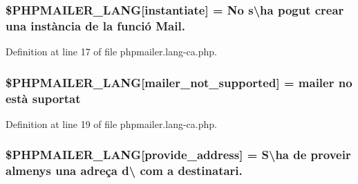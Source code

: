 \subsubsection[{\texorpdfstring{\$\+P\+H\+P\+M\+A\+I\+L\+E\+R\+\_\+\+L\+A\+NG}{$PHPMAILER_LANG}}]{\setlength{\rightskip}{0pt plus 5cm}\$P\+H\+P\+M\+A\+I\+L\+E\+R\+\_\+\+L\+A\+NG\mbox{[}\textquotesingle{}instantiate\textquotesingle{}\mbox{]} = \textquotesingle{}No s\textbackslash{}\textquotesingle{}ha pogut crear una instància de la funció Mail.\textquotesingle{}}\hypertarget{phpmailer_8lang-ca_8php_ad58dde16780f4770ccf4dd282ea1f5ad}{}\label{phpmailer_8lang-ca_8php_ad58dde16780f4770ccf4dd282ea1f5ad}


Definition at line 17 of file phpmailer.\+lang-\/ca.\+php.

\subsubsection[{\texorpdfstring{\$\+P\+H\+P\+M\+A\+I\+L\+E\+R\+\_\+\+L\+A\+NG}{$PHPMAILER_LANG}}]{\setlength{\rightskip}{0pt plus 5cm}\$P\+H\+P\+M\+A\+I\+L\+E\+R\+\_\+\+L\+A\+NG\mbox{[}\textquotesingle{}mailer\+\_\+not\+\_\+supported\textquotesingle{}\mbox{]} = \textquotesingle{} mailer no està suportat\textquotesingle{}}\hypertarget{phpmailer_8lang-ca_8php_aa2ebcb8833ee83a7ad67401c4bb3a6ad}{}\label{phpmailer_8lang-ca_8php_aa2ebcb8833ee83a7ad67401c4bb3a6ad}


Definition at line 19 of file phpmailer.\+lang-\/ca.\+php.

\subsubsection[{\texorpdfstring{\$\+P\+H\+P\+M\+A\+I\+L\+E\+R\+\_\+\+L\+A\+NG}{$PHPMAILER_LANG}}]{\setlength{\rightskip}{0pt plus 5cm}\$P\+H\+P\+M\+A\+I\+L\+E\+R\+\_\+\+L\+A\+NG\mbox{[}\textquotesingle{}provide\+\_\+address\textquotesingle{}\mbox{]} = \textquotesingle{}S\textbackslash{}\textquotesingle{}ha de proveir almenys una adreça d\textbackslash{} com {\bf a} destinatari.\textquotesingle{}}\hypertarget{phpmailer_8lang-ca_8php_a8b97897c2406b7392b056f375feeefbb}{}\label{phpmailer_8lang-ca_8php_a8b97897c2406b7392b056f375feeefbb}


